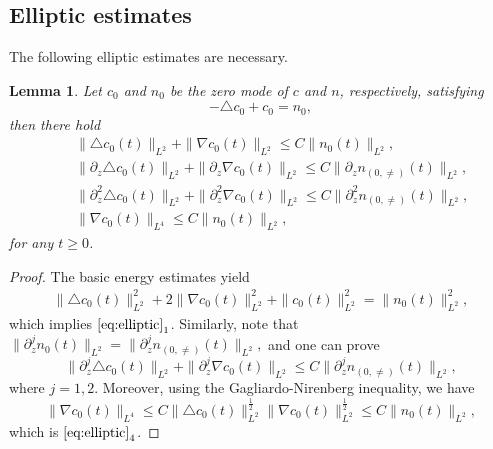 \documentclass[12pt, reqno]{amsart}
\newtheorem{lemma}{Lemma}[section]
\newcommand{\ben}{\begin{eqnarray}}
\newcommand{\een}{\end{eqnarray}}
\numberwithin{equation}{section}
\begin{document}
	
	
	
	
	
	\subsection{Elliptic estimates}
	The following  elliptic estimates are necessary.
	\begin{lemma}\label{lem:ellip_0}
		Let $c_0$ and $n_{0}$ be the zero mode of $c$ and $n$, respectively, satisfying
		$$-\triangle c_0+c_0=n_{0},$$
		then there hold
		\ben\label{eq:elliptic}
		&&\|\triangle c_0(t)\|_{L^2}+\|\nabla c_0(t)\|_{L^2}
		\leq C\|n_{0}(t)\|_{L^2},\nonumber\\
		&&\|\partial_z\triangle c_0(t)\|_{L^2}+\|\partial_z\nabla c_0(t)\|_{L^2}
		\leq C\|\partial_zn_{(0,\neq)}(t)\|_{L^2},\nonumber\\
		&&\|\partial_z^2\triangle c_0(t)\|_{L^2}+\|\partial_z^2\nabla c_0(t)\|_{L^2}
		\leq C\|\partial_z^2n_{(0,\neq)}(t)\|_{L^2},\nonumber\\
		&&\|\nabla c_0(t)\|_{L^4}\leq C\|n_{0}(t)\|_{L^2},
		\een
		for any $t\geq0$.
	\end{lemma}
	\begin{proof}
		The basic energy estimates yield
		\begin{equation}
			\begin{aligned}
				\|\triangle c_0(t)\|^2_{L^2}+2\|\nabla c_0(t)\|^2_{L^2}+\|c_0(t)\|^2_{L^2}
				=\|n_{0}(t)\|^2_{L^2},
				\nonumber
			\end{aligned}
		\end{equation}
		which implies $\eqref{eq:elliptic}_1$.
		Similarly, note that  $\|\partial_z^jn_{0}(t)\|_{L^2}=\|\partial_z^jn_{(0,\neq)}(t)\|_{L^2},$ and one can prove 
		$$\|\partial_z^j\triangle c_0(t)\|_{L^2}
		+\|\partial_z^j\nabla c_0(t)\|_{L^2}\leq C\|\partial_z^jn_{(0,\neq)}(t)\|_{L^2},$$
		where $j=1,2.$ Moreover,
		using the Gagliardo-Nirenberg inequality, we have
		$$\|\nabla c_0(t)\|_{L^4}
		\leq C\|\triangle c_0(t)\|^{\frac{1}{2}}_{L^2}
		\|\nabla c_0(t)\|^{\frac{1}{2}}_{L^2}
		\leq C\|n_{0}(t)\|_{L^2},$$	
		which is $\eqref{eq:elliptic}_4$.
	\end{proof}
	
\end{document}
